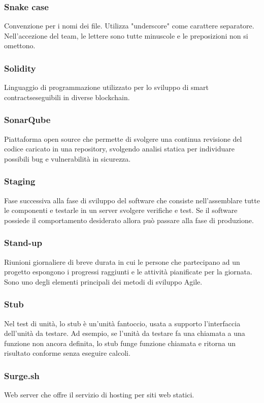 \subsubsection*{Snake case}
Convenzione per i nomi dei file. Utilizza "underscore" come carattere separatore. Nell'accezione del team, le lettere sono tutte minuscole e le preposizioni non si omettono.

\subsubsection*{Solidity}
Linguaggio di programmazione utilizzato per lo sviluppo di smart contracts\glosp eseguibili in diverse blockchain\glo.

\subsubsection*{SonarQube}
Piattaforma open source che permette di svolgere una continua revisione del codice caricato in una repository, svolgendo analisi statica per individuare possibili bug e vulnerabilità in sicurezza.

\subsubsection*{Staging}
Fase successiva alla fase di sviluppo del software che consiste nell'assemblare tutte le componenti e testarle in un server svolgere verifiche e test. Se il software possiede il comportamento desiderato allora può passare alla fase di produzione.

\subsubsection*{Stand-up}
Riunioni giornaliere di breve durata in cui le persone che partecipano ad un progetto espongono i progressi raggiunti e le attività pianificate per la giornata. Sono uno degli elementi principali dei metodi di sviluppo Agile\glo. 

\subsubsection*{Stub}
Nel test di unità, lo stub è un'unità fantoccio, usata a supporto l'interfaccia dell'unità da testare. Ad esempio, se l'unità da testare fa una chiamata a una funzione non ancora definita, lo stub funge funzione chiamata e ritorna un risultato conforme senza eseguire calcoli.

\subsubsection*{Surge.sh}
Web server che offre il servizio di hosting per siti web statici.

